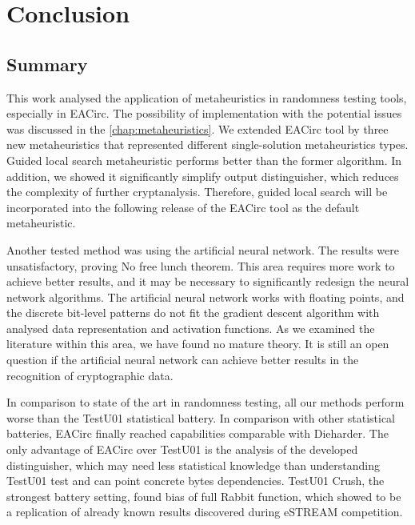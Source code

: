 \documentclass[
  print, %
  Table,   %
  nolof,     %
  nolot,     %
  11pt, %
  oneside  %
]{fithesis3}
\begin{document}

\chapter{Conclusion}
\label{chap:conclusion}

\section{Summary}
\label{sec:conclusion-summary}

This work analysed the application of metaheuristics in randomness testing tools, especially in EACirc. The possibility of implementation with the potential issues was discussed in the \cref{chap:metaheuristics}. We extended EACirc tool by three new metaheuristics that represented different single-solution metaheuristics types. Guided local search metaheuristic performs better than the former algorithm. In addition, we showed it significantly simplify output distinguisher, which reduces the complexity of further cryptanalysis. Therefore, guided local search will be incorporated into the following release of the EACirc tool as the default metaheuristic.

Another tested method was using the artificial neural network. The results were unsatisfactory, proving No free lunch theorem. This area requires more work to achieve better results, and it may be necessary to significantly redesign the neural network algorithms. The artificial neural network works with floating points, and the discrete bit-level patterns do not fit the gradient descent algorithm with analysed data representation and activation functions. As we examined the literature within this area, we have found no mature theory. It is still an open question if the artificial neural network can achieve better results in the recognition of cryptographic data.

In comparison to state of the art in randomness testing, all our methods perform worse than the TestU01 statistical battery. In comparison with other statistical batteries, EACirc finally reached capabilities comparable with Dieharder. The only advantage of EACirc over TestU01 is the analysis of the developed distinguisher, which may need less statistical knowledge than understanding TestU01 test and can point concrete bytes dependencies. TestU01 Crush, the strongest battery setting, found bias of full Rabbit function, which showed to be a replication of already known results discovered during eSTREAM competition.
\end{document}
